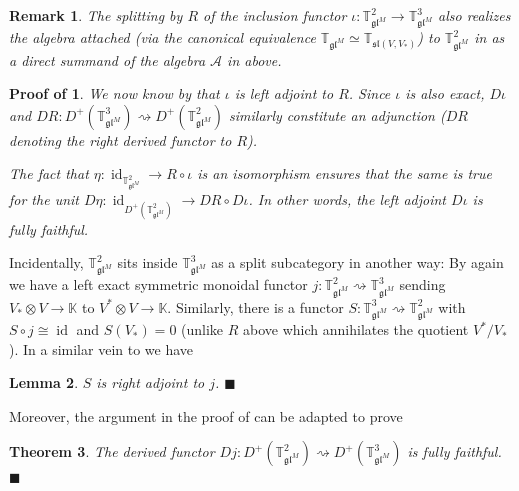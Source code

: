 \documentclass[11pt]{article}
\theoremstyle{plain}
\newtheorem{lemma}{Lemma}[section]
\newtheorem{theorem}[lemma]{Theorem}
\theoremstyle{nonumberplain}
\theoremstyle{plain}
\newtheorem{remark}[lemma]{Remark}
\theoremstyle{nonumberplain}
\newtheorem{proof_of_3d_derived_ff}{Proof of \Cref{th.3d_derived_ff}}
\newcommand\bK{{\mathbb K}}
\newcommand\bT{{\mathbb T}}
\newcommand\cA{{\mathcal A}}
\newcommand\fgl{\mathfrak{gl}}
\DeclareMathOperator{\id}{id}
\newcommand{\qedhere}{\mbox{}\hfill\ensuremath{\blacksquare}}
\begin{document}
\begin{remark}\label{re.algs-split}
  The splitting by $R$ of the inclusion functor $\iota:\bT^2_{\fgl^M}\to \bT^3_{\fgl^M}$ also realizes the algebra attached (via the canonical equivalence $\bT_{\fgl^M}\simeq\bT_{\mathfrak{sl}(V,V_*)}$) to $\bT_{\fgl^M}^2$ in \cite[$\S$5]{DPS} as a direct summand of the algebra $\cA$ in  above.  
\end{remark}


\begin{proof_of_3d_derived_ff}
  We now know by  that $\iota$ is left adjoint to $R$. Since $\iota$ is also exact, $D\iota$ and $DR:D^+(\bT^3_{\fgl^M})\rightsquigarrow D^+\left(\bT^2_{\fgl^M}\right)$ similarly constitute an adjunction ($DR$ denoting the right derived functor to $R$). 

The fact that $\eta:\id_{\bT^2_{\fgl^M}}\to R\circ\iota$ is an isomorphism ensures that the same is true for the unit $D\eta:\id_{D^+\left(\bT^2_{\fgl^M}\right)}\to DR\circ D\iota$. In other words, the left adjoint $D\iota$ is fully faithful.    
\end{proof_of_3d_derived_ff}





Incidentally, $\bT^2_{\fgl^M}$ sits inside $\bT^3_{\fgl^M}$ as a split subcategory in another way: By  again we have a left exact symmetric monoidal functor $j:\bT^2_{\fgl^M}\rightsquigarrow \bT^3_{\fgl^M}$ sending $V_*\otimes V\to \bK$ to $V^*\otimes V\to \bK$. Similarly, there is a functor $S:\bT^3_{\fgl^M}\rightsquigarrow\bT^2_{\fgl^M}$ with $S\circ j\cong \id$ and $S\left(V_*\right)=0$ (unlike $R$ above which annihilates the quotient $V^*/V_*$).  In a similar vein to  we have



\begin{lemma}
$S$ is right adjoint to $j$. 
\qedhere  
\end{lemma}


Moreover, the argument in the proof of  can be adapted to prove



\begin{theorem}\label{th.3d_derived_ff_bis}
The derived functor $Dj:D^+\left(\bT^2_{\fgl^M}\right)\rightsquigarrow D^+\left(\bT^3_{\fgl^M}\right)$ is fully faithful.  
\qedhere  
\end{theorem}
\end{document}

